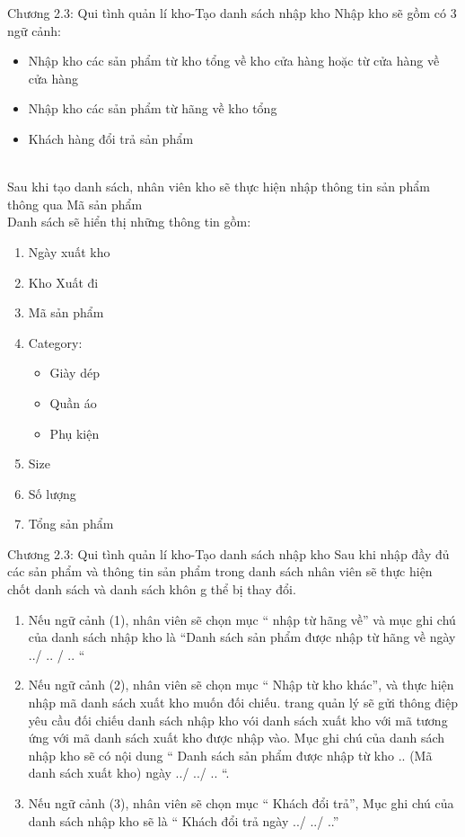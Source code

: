 \documentclass{beamer}
\begin{document}
\begin{frame}{Chương 2.3: Qui tình quản lí kho-Tạo danh sách nhập kho}
    Nhập kho sẽ gồm có 3 ngữ cảnh:
    \begin{itemize}
        \item Nhập kho các sản phẩm từ kho tổng về kho cửa hàng hoặc từ cửa hàng về cửa hàng\\
        \item Nhập kho các sản phẩm từ hãng về kho tổng
        \item Khách hàng đổi trả sản phẩm
    \end{itemize}\\
    Sau khi tạo danh sách, nhân viên kho sẽ thực hiện nhập thông tin sản phẩm thông qua Mã sản phẩm\\
    Danh sách sẽ hiển thị những thông tin gồm: 
        \begin{enumerate}
            \item Ngày xuất kho
            \item Kho Xuất đi
            \item Mã sản phẩm
            \item Category:
                \begin{itemize}
                    \item Giày dép
                    \item Quần áo
                    \item Phụ kiện
                \end{itemize}
            \item Size
            \item Số lượng
            \item Tổng sản phẩm
        \end{enumerate}
\end{frame}
\begin{frame}{Chương 2.3: Qui tình quản lí kho-Tạo danh sách nhập kho}
    Sau khi nhập đầy đủ các sản phẩm và thông tin sản phẩm trong danh sách nhân viên sẽ thực hiện chốt danh sách và danh sách khôn g thể bị thay đổi. 
        \begin{enumerate}
            \item 	Nếu ngữ cảnh (1), nhân viên sẽ chọn mục “ nhập từ hãng về” và  mục ghi chú của danh sách nhập kho là “Danh sách sản phẩm được nhập từ hãng về ngày ../ .. /  .. “ 
            \item 	Nếu ngữ cảnh (2), nhân viên sẽ chọn mục “ Nhập từ kho khác”, và thực hiện nhập mã danh sách xuất kho muốn đối chiếu. trang quản lý sẽ gửi thông điệp yêu cầu đối chiếu danh sách nhập kho vói danh sách xuất kho với mã tương ứng với mã danh sách xuất kho được nhập vào. Mục ghi chú của danh sách nhập kho sẽ có nội dung “  Danh sách sản phẩm được nhập từ kho .. (Mã danh sách xuất kho) ngày ../  ../  .. “.
            \item 	Nếu ngữ cảnh (3), nhân viên sẽ chọn mục “ Khách đổi trả”, Mục ghi chú của danh sách nhập kho sẽ là “ 
            Khách đổi trả ngày ../ ../ ..”
        \end{enumerate}
\end{frame}
\end{document}
